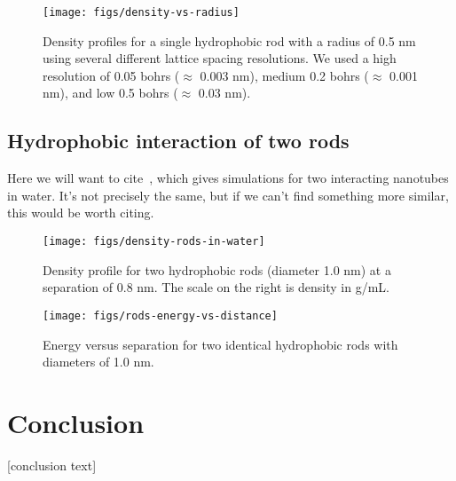 \documentclass[letterpaper,twocolumn,amsmath,amssymb,prb]{revtex4-1}
\begin{document}
\begin{figure}
\begin{center}
\texttt{[image: figs/density-vs-radius]}
\end{center}
\caption{ Density profiles for 
a single hydrophobic rod with a radius of 0.5 nm using several different 
lattice spacing resolutions. We used a high resolution of 0.05 bohrs ($\approx$ 0.003 nm), 
medium 0.2 bohrs ($\approx$ 0.001 nm), and low 0.5 bohrs ($\approx$ 0.03 nm).}
\label{fig:densityresolution}
\end{figure}

\subsection{Hydrophobic interaction of two rods}

Here we will want to cite~\cite{walther2004hydrodynamic}, which gives
simulations for two interacting nanotubes in water.  It's not
precisely the same, but if we can't find something more similar, this
would be worth citing.

\begin{figure}
\begin{center}
\texttt{[image: figs/density-rods-in-water]}
\end{center}
\caption{ Density profile for two hydrophobic rods (diameter 1.0 nm) at a 
separation of 0.8 nm. The scale on the right is density in g/mL.}
\label{fig:density-rods}
\end{figure}

\begin{figure}
\begin{center}
\texttt{[image: figs/rods-energy-vs-distance]}
\end{center}
\caption{ Energy versus separation for two identical hydrophobic rods with diameters
of 1.0 nm. }
\label{fig:rods-energy-vs-distance}
\end{figure}


\section{Conclusion}

[conclusion text]

\end{document}
